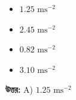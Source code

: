 \documentclass[12pt, a4paper]{article}
\begin{document}
\begin{itemize}[label={}, leftmargin=1cm, itemsep=0.5em]
\item[\textbf{A)}] $1.25\text{ ms}^{-2}$
\item[\textbf{B)}] $2.45\text{ ms}^{-2}$
\item[\textbf{C)}] $0.82\text{ ms}^{-2}$
\item[\textbf{D)}] $3.10\text{ ms}^{-2}$
\end{itemize}

\vspace{0.5em}
\begin{tcolorbox}[answerbox]
\textbf{\color{success} উত্তর:} A) $1.25\text{ ms}^{-2}$
\end{tcolorbox}
\vspace{1em}
\end{document}
